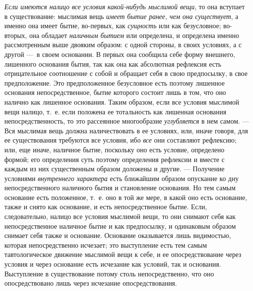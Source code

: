 {\em Если имеются налицо все условия какой-нибудь
мыслимой вещи}, то она вступает в существование: мыслимая вещь
{\em имеет бытие ранее, чем она существует}, а именно
она имеет бытие, во-первых, как {\em сущность} или как
безусловное; во-вторых, она обладает {\em наличным
бытием} или определена, и определена именно рассмотренным выше двояким
образом: с одной стороны, в своих условиях, а с другой —~в своем основании.
В первых она сообщила себе форму внешнего, лишенного основания бытия, так
как она как абсолютная рефлексия есть отрицательное соотношение с собой и
обращает себя в свою предпосылку, в свое предположение. Это предположенное
безусловное есть поэтому лишенное основания непосредственное, бытие
которого состоит лишь в том, что оно налично как лишенное основания. Таким
образом, если все условия мыслимой вещи налицо, т.~е. если положена ее
тотальность как лишенная основания непосредственность, то это рассеянное
многообразие {\em углубляется} в нем самом. — Вся
мыслимая вещь должна наличествовать в ее условиях, или, иначе говоря, для
ее существования требуются все условия, ибо {\em все}
они составляют рефлексию; или, еще иначе, наличное бытие, поскольку оно
есть условие, определено формой; его определения суть поэтому определения
рефлексии и вместе с каждым из них существенным образом доложены и другие.
— Получение условиями {\em внутреннего характера} есть
ближайшим образом опускание ко дну непосредственного наличного бытия и
становление основания. Но тем самым основание есть положенное, т.~е. оно в
той же мере, в какой оно есть основание, также и снято как основание, и
есть непосредственное бытие. Если, следовательно, налицо все условия
мыслимой вещи, то они снимают себя как непосредственное наличное бытие и
как предпосылку, и одинаковым образом снимает себя также и основание.
Основание оказывается лишь видимостью, которая непосредственно исчезает;
это выступление есть тем самым тавтологическое движение мыслимой вещи к
себе, и ее опосредствование через условия и через основание есть исчезание
как условий, так и основания. Выступление в существование потому столь
непосредственно, что оно опосредствовано лишь через исчезание
опосредствования.

